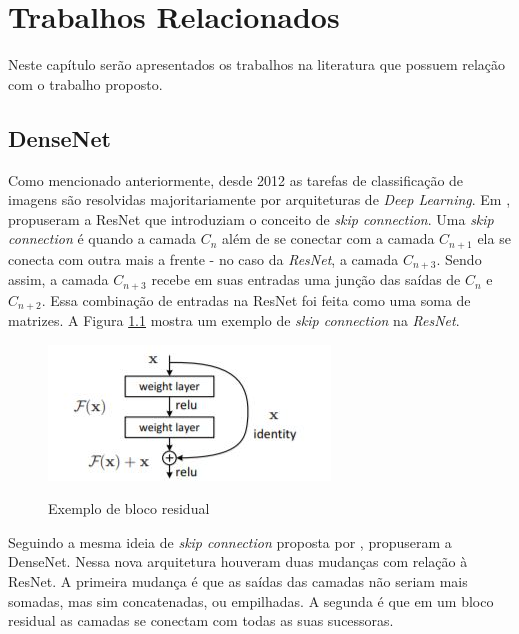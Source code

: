\chapter{Trabalhos Relacionados}
\label{cap:3}
\vspace{-1.9cm}

Neste capítulo serão apresentados os trabalhos na literatura que possuem relação com o trabalho proposto.

\section{DenseNet}
\label{secao:3:1}

Como mencionado anteriormente, desde 2012 as tarefas de classificação de imagens são resolvidas majoritariamente por arquiteturas de \textit{Deep Learning}. Em \citeyear{he-2016}, \citeauthor{he-2016} propuseram a \ac{ResNet} que introduziam o conceito de \textit{skip connection}. Uma \textit{skip connection} é quando a camada $C_n$ além de se conectar com a camada $C_{n+1}$ ela se conecta com outra mais a frente - no caso da \textit{\ac{ResNet}}, a camada $C_{n+3}$. Sendo assim, a camada $C_{n+3}$ recebe em suas entradas uma junção das saídas de $C_{n}$ e $C_{n+2}$. Essa combinação de entradas na \ac{ResNet} foi feita como uma soma de matrizes. A Figura \ref{fig:blocoresidual} mostra um exemplo de \textit{skip connection} na \textit{\ac{ResNet}}.

\begin{figure}[t]
	\setlength{\abovecaptionskip}{0pt}
	\setlength{\belowcaptionskip}{0pt}
	\caption[Exemplo de bloco residual]{Exemplo de bloco residual}
	\centering
	\includegraphics[width=.5\textwidth]{imagem/0x_resnet_arch.jpg}
	\captionsetup{justification=centering}
	\label{fig:blocoresidual}
\end{figure}

Seguindo a mesma ideia de \textit{skip connection} proposta por ,  propuseram a \ac{DenseNet}. Nessa nova arquitetura houveram duas mudanças com relação à \ac{ResNet}. A primeira mudança é que as saídas das camadas não seriam mais somadas, mas sim concatenadas, ou empilhadas. A segunda é que em um bloco residual as camadas se conectam com todas as suas sucessoras. 

